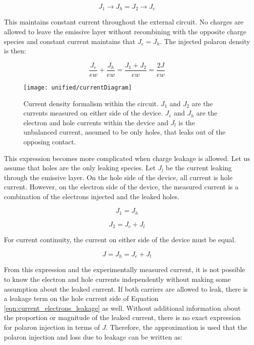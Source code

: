 \documentclass[../thesis.tex]{subfiles}
\begin{document}
\begin{equation}
J_1\rightarrow J_h = J_2 \rightarrow J_e
\label{eqn:current_no_leakage}
\end{equation}

This maintains constant current throughout the external circuit. 
No charges are allowed to leave the emissive layer without recombining with the opposite charge species and constant current maintains that $J_e=J_h$.  
The injected polaron density is then:


\begin{equation}
\frac{J_e}{ew}+\frac{J_h}{ew}=\frac{J_1+J_2}{ew}=\frac{2J}{ew}
\label{eqn:injected_polarons_no_leakage}
\end{equation}

\begin{wrapfigure}[20]{R}{0.5\textwidth}
\texttt{[image: unified/currentDiagram]}
\caption{Current density formalism within the circuit. $J_1$ and $J_2$ are the currents measured on either side of the device. $J_e$ and $J_h$ are the electron and hole currents within the device and $J_l$ is the unbalanced current, assumed to be only holes, that leaks out of the opposing contact.}
\label{fig:currentDiagram}
\end{wrapfigure}
This expression becomes more complicated when charge leakage is allowed. Let us assume that holes are the only leaking species. 
Let $J_l$ be the current leaking through the emissive layer. 
On the hole side of the device, all current is hole current. 
However, on the electron side of the device, the measured current is a combination of the electrons injected and the leaked holes.

\begin{equation}
J_1=J_h
\label{eqn:current_holes_leakage}
\end{equation}

\begin{equation}
J_2=J_e+J_l
\label{eqn:current_electrons_leakage}
\end{equation}

For current continuity, the current on either side of the device must be equal.

\begin{equation}
J=J_h=J_e+J_l
\label{eqn:current_continuity_leakage}
\end{equation}

From this expression and the experimentally measured current, it is not possible to know the electron and hole currents independently without making some assumption about the leaked current.  
If both carriers are allowed to leak, there is a leakage term on the hole current side of Equation \ref{eqn:current_electrons_leakage} as well.  
Without additional information about the proportion or magnitude of the leaked current, there is no exact expression for polaron injection in terms of $J$.  
Therefore, the approximation is used that the polaron injection and loss due to leakage can be written as:
\end{document}
